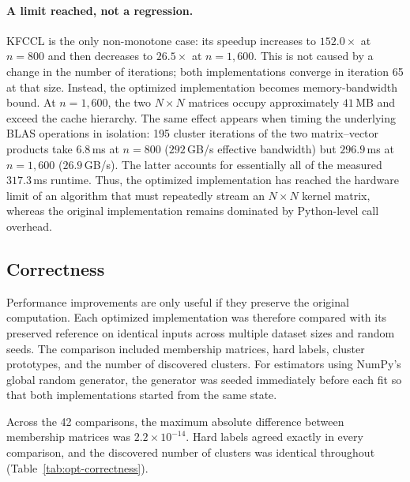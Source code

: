 \documentclass[twoside,11pt]{article}
\begin{document}
\paragraph{A limit reached, not a regression.}
KFCCL is the only non-monotone case: its speedup increases to $152.0\times$ at
$n=800$ and then decreases to $26.5\times$ at $n=1{,}600$. This is not caused
by a change in the number of iterations; both implementations converge in
iteration 65 at that size. Instead, the optimized implementation becomes
memory-bandwidth bound. At $n=1{,}600$, the two $N\times N$ matrices occupy
approximately $41$\,MB and exceed the cache hierarchy. The same effect appears
when timing the underlying BLAS operations in isolation: 195 cluster
iterations of the two matrix--vector products take $6.8$\,ms at $n=800$
($292$\,GB/s effective bandwidth) but $296.9$\,ms at $n=1{,}600$
($26.9$\,GB/s). The latter accounts for essentially all of the measured
$317.3$\,ms runtime. Thus, the optimized implementation has reached the
hardware limit of an algorithm that must repeatedly stream an
$N\times N$ kernel matrix, whereas the original implementation remains
dominated by Python-level call overhead.

\subsection{Correctness}

Performance improvements are only useful if they preserve the original
computation. Each optimized implementation was therefore compared with its
preserved reference on identical inputs across multiple dataset sizes and
random seeds. The comparison included membership matrices, hard labels,
cluster prototypes, and the number of discovered clusters. For estimators
using NumPy's global random generator, the generator was seeded immediately
before each fit so that both implementations started from the same state.

Across the 42 comparisons, the maximum absolute difference between membership
matrices was $2.2\times10^{-14}$. Hard labels agreed exactly in every
comparison, and the discovered number of clusters was identical throughout
(Table~\ref{tab:opt-correctness}).
\end{document}
